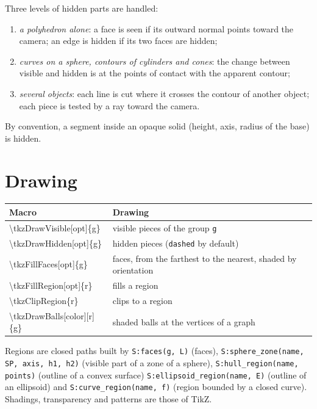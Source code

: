 \documentclass[11pt]{article}
\newcommand\code[1]{\texttt{#1}}
\newcommand\bs{\textbackslash}
\begin{document}
Three levels of hidden parts are handled:
\begin{enumerate}
  \item \emph{a polyhedron alone}: a face is seen if its outward normal
        points toward the camera; an edge is hidden if its two faces are
        hidden;
  \item \emph{curves on a sphere, contours of cylinders and cones}: the
        change between visible and hidden is at the points of contact with
        the apparent contour;
  \item \emph{several objects}: each line is cut where it crosses the
        contour of another object; each piece is tested by a ray toward the
        camera.
\end{enumerate}
By convention, a segment inside an opaque solid (height, axis, radius of the
base) is hidden.

\section{Drawing}

\begin{center}
\begin{tabular}{>{\ttfamily}l p{8cm}}
\toprule
\textrm{Macro} & Drawing \\
\midrule
\bs tkzDrawVisible[opt]\{g\} & visible pieces of the group \code{g} \\
\bs tkzDrawHidden[opt]\{g\}  & hidden pieces (\code{dashed} by default) \\
\bs tkzFillFaces[opt]\{g\}   & faces, from the farthest to the nearest,
                               shaded by orientation \\
\bs tkzFillRegion[opt]\{r\}  & fills a region \\
\bs tkzClipRegion\{r\}       & clips to a region \\
\bs tkzDrawBalls[color][r]\{g\} & shaded balls at the vertices of a graph \\
\bottomrule
\end{tabular}
\end{center}

Regions are closed paths built by \code{S:faces(g, L)} (faces),
\code{S:sphere\_zone(name, SP, axis, h1, h2)} (visible part of a zone of a
sphere), \code{S:hull\_region(name, points)} (outline of a convex surface)
\code{S:ellipsoid\_region(name, E)} (outline of an ellipsoid)
and \code{S:curve\_region(name, f)} (region bounded by a closed curve).
Shadings, transparency and patterns are those of TikZ.
\end{document}
